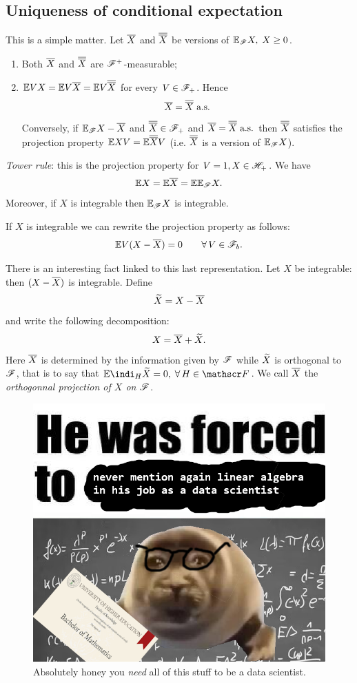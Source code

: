 \documentclass{report}
\begin{document}
\subsection{Uniqueness of conditional expectation}
This is a simple matter. Let $\overline{X}$ and $\overline{\overline{X}}$ be versions of $\mathbb{E}_{\mathscr{F}}X,\;X\geq 0$.
\begin{enumerate}
	\item Both $\overline{X}$ and $\overline{\overline{X}}$ are $\mathscr{F}^{+}$-measurable;
	\item $\mathbb{E} VX=\mathbb{E} V\overline{X}=\mathbb{E} V\overline{\overline{X}}$ for every $V\in\mathscr{F}_{+}$. Hence 
	\[\overline{X}=\overline{\overline{X}}\text{ a.s.}\]
	Conversely, if $\mathbb{E}_{\mathscr{F}}X-\overline{X}$ and $\overline{\overline{X}}\in\mathscr{F}_+$ and $\overline{X}=\overline{\overline{X}}\text{ a.s.}$ then $\overline{\overline{X}}$ satisfies the projection property $\mathbb{E} XV=\mathbb{E}\overline{\overline{X}} V$ (i.e. $\overline{\overline{X}}$ is a version of $\mathbb{E}_{\mathscr{F}} X$).
\end{enumerate}
\begin{remark}
	\emph{Tower rule}: this is the projection property for $V=1, X\in\mathscr{H}_{+}$. We have
	\[\mathbb{E} X=\mathbb{E}\overline{X}=\mathbb{E}\mathbb{E}_{\mathscr{F}} X.\]
	Moreover, if $X$ is integrable then $\mathbb{E}_{\mathscr{F}} X$ is integrable.
\end{remark}
\begin{remark}
	If $X$ is integrable we can rewrite the projection property as follows:
	\begin{equation*}
		\mathbb{E} V(X-\overline{X})=0\qquad\forall\, V\in\mathscr{F}_b.
	\end{equation*}
\end{remark}
There is an interesting fact linked to this last representation. Let $X$ be integrable: then $(X-\overline{X})$ is integrable. Define
\[\widetilde{X}=X-\overline{X}\]
and write the following decomposition:
\[X=\overline{X}+\widetilde{X}.\]
Here $\overline{X}$ is determined by the information given by $\mathscr{F}$ while $\widetilde{X}$ is orthogonal to $\mathscr{F}$, that is to say that $\ev\indi_H\xtilde=0,\;\every H\in\F$. We call $\overline{X}$ the \emph{orthogonnal projection of $X$ on $\mathscr{F}$}.
\begin{figure}[H]
	\centering
	\includegraphics[width=0.65\linewidth]{sadmath}
	\caption[Mathematicians when]{Absolutely honey you \textit{need} all of this stuff to be a data scientist.}
	\label{fig:sadmath}
\end{figure}
\end{document}
